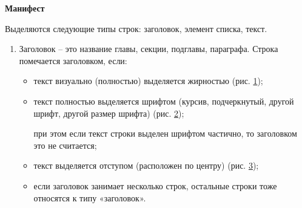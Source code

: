\documentclass{ProcISPRAS}
\begin{document}
{\bfseries Манифест}

Выделяются следующие типы строк: заголовок, элемент списка, текст.

\begin{enumerate}
	\item Заголовок -- это название главы, секции, подглавы, параграфа. Строка помечается заголовком, если:
	\begin{itemize}
		\item текст визуально (полностью) выделяется жирностью (рис. \ref{fig:1});
		
		\begin{figure}[ht]
		    \label{fig:1}
		\end{figure}
		
		\item текст полностью выделяется шрифтом (курсив, подчеркнутый, другой шрифт, другой размер шрифта) (рис. \ref{fig:2});
		
		\begin{figure}[ht]
		    \label{fig:2}
		\end{figure}
		
		при этом если текст строки выделен шрифтом частично, то заголовком это не считается;
		
		\item текст выделяется отступом (расположен по центру) (рис. \ref{fig:3});
		
		\begin{figure}[ht]
		    \label{fig:3}
		\end{figure}
		
		\item если заголовок занимает несколько строк, остальные строки тоже относятся к типу «заголовок».
	\end{itemize}
	

\end{enumerate}
\end{document}
